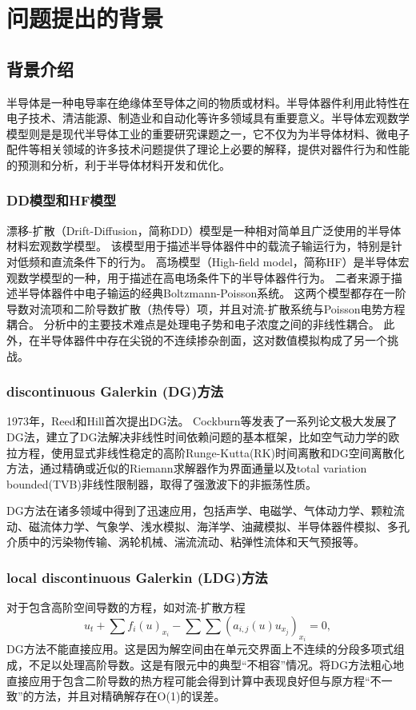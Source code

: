 \section{问题提出的背景}

\subsection{背景介绍}
半导体是一种电导率在绝缘体至导体之间的物质或材料。半导体器件利用此特性在电子技术、清洁能源、制造业和自动化等许多领域具有重要意义。半导体宏观数学模型则是是现代半导体工业的重要研究课题之一，它不仅为为半导体材料、微电子配件等相关领域的许多技术问题提供了理论上必要的解释，提供对器件行为和性能的预测和分析，利于半导体材料开发和优化。
\subsubsection{DD模型\cite{cercignani2000device}和HF模型\cite{cercignani2000device}}
漂移-扩散（Drift-Diffusion，简称DD）模型是一种相对简单且广泛使用的半导体材料宏观数学模型。
该模型用于描述半导体器件中的载流子输运行为，特别是针对低频和直流条件下的行为。
高场模型（High-field model，简称HF）是半导体宏观数学模型的一种，用于描述在高电场条件下的半导体器件行为。
二者来源于描述半导体器件中电子输运的经典Boltzmann-Poisson系统。
这两个模型都存在一阶导数对流项和二阶导数扩散（热传导）项，并且对流-扩散系统与Poisson电势方程耦合\cite{cercignani2000device}。
分析中的主要技术难点是处理电子势和电子浓度之间的非线性耦合。
此外，在半导体器件中存在尖锐的不连续掺杂剖面，这对数值模拟构成了另一个挑战。
\subsubsection{discontinuous Galerkin (DG)方法}
1973年，Reed和Hill首次提出DG法\cite{reed1973triangular}。
Cockburn等发表了一系列论文极大发展了DG法，建立了DG法解决非线性时间依赖问题的基本框架\cite{reed1973triangular,cockburn1991runge,cockburn1989tvb2,cockburn1989tvb3,cockburn1990runge,cockburn1998runge}，比如空气动力学的欧拉方程，使用显式非线性稳定的高阶Runge-Kutta(RK)时间离散和DG空间离散化方法，通过精确或近似的Riemann求解器作为界面通量以及total variation bounded(TVB)非线性限制器，取得了强激波下的非振荡性质。

DG方法在诸多领域中得到了迅速应用，包括声学、电磁学、气体动力学、颗粒流动、磁流体力学、气象学、浅水模拟、海洋学、油藏模拟、半导体器件模拟、多孔介质中的污染物传输、涡轮机械、湍流流动、粘弹性流体和天气预报等\cite{cockburn2000development}。

\subsubsection{local discontinuous Galerkin (LDG)方法}
对于包含高阶空间导数的方程，如对流-扩散方程
\begin{equation}\label{eq:convection-diffusion}
    u_t + \sum f_i(u)_{x_i} - \sum \sum (a_{i,j}(u)u_{x_j})_{x_i} = 0,
\end{equation}
DG方法不能直接应用。这是因为解空间由在单元交界面上不连续的分段多项式组成，不足以处理高阶导数。这是有限元中的典型“不相容”情况。将DG方法粗心地直接应用于包含二阶导数的热方程可能会得到计算中表现良好但与原方程“不一致”的方法，并且对精确解存在O(1)的误差\cite{cockburn2001runge,zhang2003analysis}。

